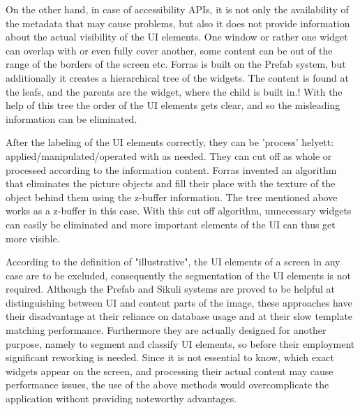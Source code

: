 \documentclass[draft,final]{vutinfth} %
\begin{document}
On the other hand, in case of accessibility APIs, it is not only the availability of the metadata that may cause problems, but also it does not provide information about the actual visibility of the UI elements.
One window or rather one widget can overlap with or even fully cover another, some content can be out of the range of the borders of the screen etc.    
Forras is built on the Prefab system, but additionally it creates a hierarchical tree of the widgets. 
The content is found at the leafs, and the parents are the widget, where the child is built in.!
With the help of this tree the order of the UI elements gets clear, and so the misleading information can be eliminated.\par
After the labeling of the UI elements correctly, they can be 'process' helyett: applied/manipulated/operated with as needed.
They can cut off as whole or processed according to the information content.
Forras invented an algorithm that eliminates the picture objects and fill their place with the texture of the object behind them using the z-buffer information.
The tree mentioned above works as a z-buffer in this case.
With this cut off algorithm, unnecessary widgets can easily be eliminated and more important elements of the UI can thus get more visible.\par
According to the definition of "illustrative", the UI elements of a screen in any case are to be excluded, consequently the segmentation of the UI elements is not required.
Although the Prefab and Sikuli systems are proved to be helpful at distinguishing between UI and content parts of the image, these approaches have their disadvantage at their reliance on database usage and at their slow template matching performance. 
Furthermore they are actually designed for another purpose, namely to segment and classify UI elements, so before their employment significant reworking is needed.
Since it is not essential to know, which exact widgets appear on the screen, and processing their actual content may cause performance issues, the use of the above methods would overcomplicate the application without providing noteworthy advantages.
\end{document}
